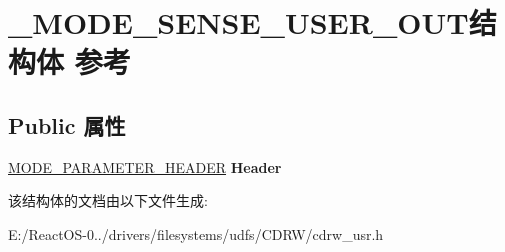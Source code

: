 \hypertarget{struct___m_o_d_e___s_e_n_s_e___u_s_e_r___o_u_t}{}\section{\+\_\+\+M\+O\+D\+E\+\_\+\+S\+E\+N\+S\+E\+\_\+\+U\+S\+E\+R\+\_\+\+O\+U\+T结构体 参考}
\label{struct___m_o_d_e___s_e_n_s_e___u_s_e_r___o_u_t}
\subsection*{Public 属性}
\begin{DoxyCompactItemize}
\item 
\mbox{\label{struct___m_o_d_e___s_e_n_s_e___u_s_e_r___o_u_t_a042820667fe9dcd32a11a00289908979}} 
\hyperlink{struct___m_o_d_e___p_a_r_a_m_e_t_e_r___h_e_a_d_e_r}{M\+O\+D\+E\+\_\+\+P\+A\+R\+A\+M\+E\+T\+E\+R\+\_\+\+H\+E\+A\+D\+ER} {\bfseries Header}
\end{DoxyCompactItemize}


该结构体的文档由以下文件生成\+:\begin{DoxyCompactItemize}
\item 
E\+:/\+React\+O\+S-\/0../drivers/filesystems/udfs/\+C\+D\+R\+W/cdrw\+\_\+usr.\+h\end{DoxyCompactItemize}
